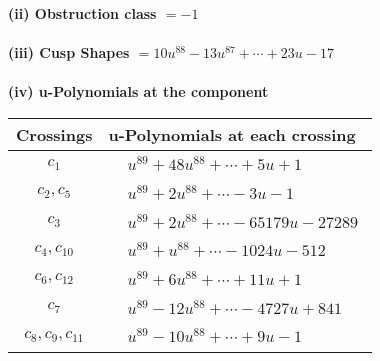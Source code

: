 \documentclass[1p]{elsarticle_modified}
\theoremstyle{definition}
\begin{document}
\flushleft \textbf{(ii) Obstruction class $= -1$}\\~\\
\flushleft \textbf{(iii) Cusp Shapes $= 10 u^{88}-13 u^{87}+\cdots+23 u-17$}\\~\\
\newpage\renewcommand{\arraystretch}{1}
\flushleft \textbf{(iv) u-Polynomials at the component}\newline \\
\begin{tabular}{m{50pt}|m{274pt}}
Crossings & \hspace{64pt}u-Polynomials at each crossing \\
\hline $$\begin{aligned}c_{1}\end{aligned}$$&$\begin{aligned}
&u^{89}+48 u^{88}+\cdots+5 u+1
\end{aligned}$\\
\hline $$\begin{aligned}c_{2},c_{5}\end{aligned}$$&$\begin{aligned}
&u^{89}+2 u^{88}+\cdots-3 u-1
\end{aligned}$\\
\hline $$\begin{aligned}c_{3}\end{aligned}$$&$\begin{aligned}
&u^{89}+2 u^{88}+\cdots-65179 u-27289
\end{aligned}$\\
\hline $$\begin{aligned}c_{4},c_{10}\end{aligned}$$&$\begin{aligned}
&u^{89}+u^{88}+\cdots-1024 u-512
\end{aligned}$\\
\hline $$\begin{aligned}c_{6},c_{12}\end{aligned}$$&$\begin{aligned}
&u^{89}+6 u^{88}+\cdots+11 u+1
\end{aligned}$\\
\hline $$\begin{aligned}c_{7}\end{aligned}$$&$\begin{aligned}
&u^{89}-12 u^{88}+\cdots-4727 u+841
\end{aligned}$\\
\hline $$\begin{aligned}c_{8},c_{9},c_{11}\end{aligned}$$&$\begin{aligned}
&u^{89}-10 u^{88}+\cdots+9 u-1
\end{aligned}$\\
\hline
\end{tabular}\\~\\
\end{document}
